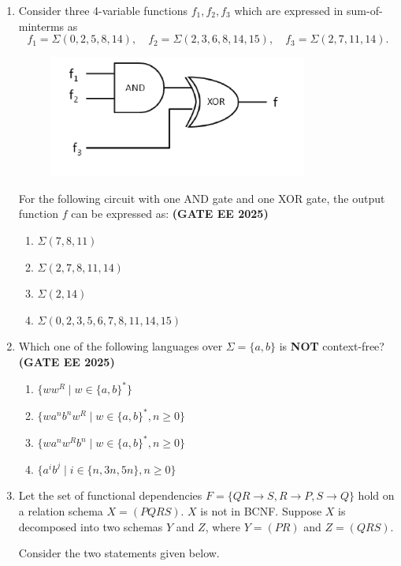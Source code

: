\documentclass[journal,12pt,onecolumn]{IEEEtran}
\theoremstyle{remark}
\begin{document}
\begin{enumerate}
\item  Consider three 4-variable functions $f_1, f_2, f_3$ which are expressed in sum-of-minterms as  
\[
f_1 = \Sigma (0,2,5,8,14), \quad 
f_2 = \Sigma (2,3,6,8,14,15), \quad 
f_3 = \Sigma (2,7,11,14).
\]  
\begin{figure}
    \centering
    \includegraphics[width=0.5\linewidth]{figs/fig4.png}
    \caption{ }
    \label{fig4}
\end{figure}
For the following circuit with one AND gate and one XOR gate, the output function $f$ can be expressed as:  \hfill \textbf{(GATE EE 2025)}

\begin{enumerate}
  \item   $\Sigma (7,8,11)$
  \item   $\Sigma (2,7,8,11,14)$
  \item   $\Sigma (2,14)$
  \item   $\Sigma (0,2,3,5,6,7,8,11,14,15)$
\end{enumerate}



\item  Which one of the following languages over $\Sigma = \{a,b\}$ is \textbf{NOT} context-free?  \hfill \textbf{(GATE EE 2025)}

\begin{enumerate}
  \item   $\{ww^R \mid w \in \{a,b\}^*\}$
  \item   $\{w a^n b^n w^R \mid w \in \{a,b\}^*, n \geq 0\}$
  \item   $\{w a^n w^R b^n \mid w \in \{a,b\}^*, n \geq 0\}$
  \item   $\{a^i b^j \mid i \in \{n,3n,5n\}, n \geq 0\}$
\end{enumerate}

\item  Let the set of functional dependencies $F = \{QR \to S, R \to P, S \to Q\}$ hold on a relation schema $X = (PQRS)$. $X$ is not in BCNF. Suppose $X$ is decomposed into two schemas $Y$ and $Z$, where $Y = (PR)$ and $Z = (QRS)$.  

Consider the two statements given below.  


\end{enumerate}
\end{document}
